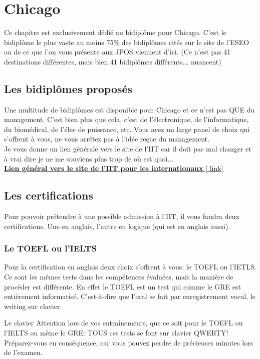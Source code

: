 \chapter{Chicago}\label{ch:ch2label}

Ce chapitre est exclusivement dédié au bidiplôme pour Chicago. C’est le bidiplôme le plus vaste au moins 75\% des bidiplômes cités sur le site de l’ESEO ou de ce que l’on vous présente aux JPOS viennent d’ici. (Ce n’est pas 41 destinations différentes, mais bien 41 bidiplômes différents... nuancent)

\section{Les bidiplômes proposés}\label{sec:sec2.1}
Une multitude de bidiplômes est disponible pour Chicago et ce n’est pas QUE du management. C’est bien plus que cela, c’est de l’électronique, de l’informatique, du biomédical, de l’élec de puissance, etc. Vous avez un large panel de choix qui s’offrent à vous, ne vous arrêtez pas à l’idée reçue du management. \\
Je vous donne un lien générale vers le site de l'IIT car il doit pas mal changer et à vrai dire je ne me souviens plus trop de où est quoi... \\
\href{https://admissions.iit.edu/graduate/apply/degree-seeking-checklist}{\textbf{Lien général vers le site de l'IIT pour les internationaux} [ link]}

\section{Les certifications}\label{sec:sec2.2}
Pour pouvoir prétendre à une possible admission à l’IIT, il vous faudra deux certifications. Une en anglais, l’autre en logique (qui est en anglais aussi).

\subsection{Le TOEFL ou l’IELTS}\label{sec:sec2.2.1}
Pour la certification en anglais deux choix s’offrent à vous: le TOEFL ou l’IETLS. Ce sont les mêmes tests dans les compétences évaluées, mais la manière de procéder est différente. En effet le TOEFL est un test qui comme le GRE est entièrement informatisé. C’est-à-dire que l’oral se fait par enregistrement vocal, le writing sur clavier.

\begin{example}{Le clavier}
  Attention lors de vos entraînements, que ce soit pour le TOEFL ou l’IELTS ou même le GRE: TOUS ces tests se font sur clavier QWERTY!
  Préparez-vous en conséquence, car vous pouvez perdre de précieuses minutes lors de l’examen.
\end{example}


